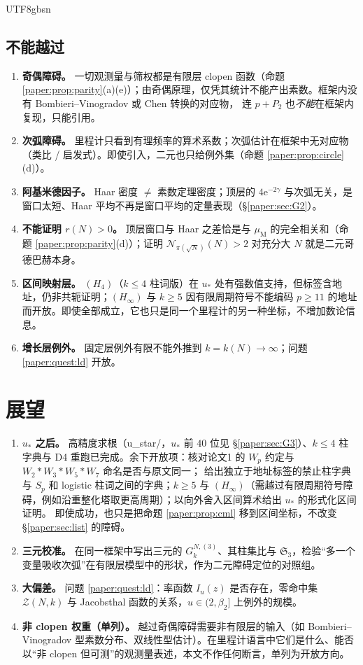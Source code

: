 \documentclass[11pt,a4paper]{article}
\newcommand{\Sing}{\mathfrak S}
\newcommand{\Cnt}{\mathcal N}          %
\newcommand{\ust}{u_{*}}               %
\newcommand{\Mob}{\mu_{\mathrm{M}}}    %
\newcommand{\ee}{\mathrm e}
\theoremstyle{plain}
\theoremstyle{definition}
\begin{document}
\begin{CJK}{UTF8}{gbsn}
\subsection{不能越过}
\begin{enumerate}[leftmargin=*]
\item \textbf{奇偶障碍。} 一切观测量与筛权都是有限层 clopen 函数（命题 \ref{paper:prop:parity}(a)(e)）；由奇偶原理，仅凭其统计不能产出素数。框架内没有 Bombieri--Vinogradov 或 Chen 转换的对应物，
连 $p+P_2$ 也\emph{不能}在框架内复现，只能引用。
\item \textbf{次弧障碍。} 里程计只看到有理频率的算术系数；次弧估计在框架中无对应物（类比 / 启发式）。即使引入，二元也只给例外集（命题 \ref{paper:prop:circle}(d)）。
\item \textbf{阿基米德因子。} Haar 密度 $\ne$ 素数定理密度；顶层的 $4\ee^{-2\gamma}$ 与次弧无关，是窗口太短、Haar 平均不再是窗口平均的定量表现（\S\ref{paper:sec:G2}）。
\item \textbf{不能证明 $r(N)>0$。} 顶层窗口与 Haar 之差恰是与 $\Mob$ 的完全相关和（命题 \ref{paper:prop:parity}(d)）；证明 $\Cnt_{\pi(\sqrt N)}(N)>2$ 对充分大 $N$ 就是二元哥德巴赫本身。
\item \textbf{区间映射层。} $(H_4)$（$k\le4$ 柱词版）在 $\ust$ 处有强数值支持，但标签含地址，仍非共轭证明；$(H_\infty)$ 与 $k\ge5$ 因有限周期符号不能编码 $p\ge11$ 的地址而开放。即使全部成立，它也只是同一个里程计的另一种坐标，不增加数论信息。
\item \textbf{增长层例外。} 固定层例外有限不能外推到 $k=k(N)\to\infty$；问题 \ref{paper:quest:ld} 开放。
\end{enumerate}

\section{展望}\label{paper:sec:outlook}
\begin{enumerate}[leftmargin=*]
\item \textbf{$\ust$ 之后。} 高精度求根（u\_star/，$\ust$ 前 $40$ 位见 \S\ref{paper:sec:G3}）、$k\le4$ 柱字典与 D4 重跑已完成。余下开放项：核对论文1 的 $W_p$ 约定与 $W_2*W_3*W_5*W_7$ 命名是否与原文同一；
给出独立于地址标签的禁止柱字典与 $S_p$ 和 logistic 柱词之间的字典；$k\ge5$ 与 $(H_\infty)$（需越过有限周期符号障碍，例如沿重整化塔取更高周期）；以向外舍入区间算术给出 $\ust$ 的形式化区间证明。
即使成功，也只是把命题 \ref{paper:prop:cml} 移到区间坐标，不改变 \S\ref{paper:sec:list} 的障碍。
\item \textbf{三元校准。} 在同一框架中写出三元的 $G_k^{N,(3)}$、其柱集比与 $\Sing_3$，检验“多一个变量吸收次弧”在有限层模型中的形状，作为二元障碍定位的对照组。
\item \textbf{大偏差。} 问题 \ref{paper:quest:ld}：率函数 $I_u(z)$ 是否存在，零命中集 $\mathcal Z(N,k)$ 与 Jacobsthal 函数的关系，$u\in(2,\beta_2]$ 上例外的规模。
\item \textbf{非 clopen 权重（单列）。} 越过奇偶障碍需要非有限层的输入（如 Bombieri--Vinogradov 型素数分布、双线性型估计）。在里程计语言中它们是什么、能否以“非 clopen 但可测”的观测量表述，本文不作任何断言，单列为开放方向。
\end{enumerate}


\end{CJK}
\end{document}
